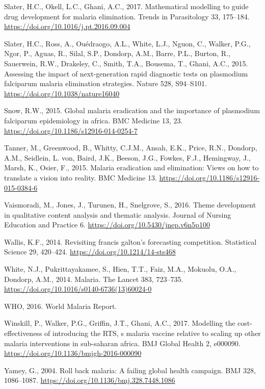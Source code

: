 \documentclass[]{article}
\begin{document}
\hypertarget{ref-Slater2017}{}
Slater, H.C., Okell, L.C., Ghani, A.C., 2017. Mathematical modelling to
guide drug development for malaria elimination. Trends in Parasitology
33, 175--184. \url{https://doi.org/10.1016/j.pt.2016.09.004}

\hypertarget{ref-Slater2015}{}
Slater, H.C., Ross, A., Ouédraogo, A.L., White, L.J., Nguon, C., Walker,
P.G., Ngor, P., Aguas, R., Silal, S.P., Dondorp, A.M., Barre, P.L.,
Burton, R., Sauerwein, R.W., Drakeley, C., Smith, T.A., Bousema, T.,
Ghani, A.C., 2015. Assessing the impact of next-generation rapid
diagnostic tests on plasmodium falciparum malaria elimination
strategies. Nature 528, S94--S101.
\url{https://doi.org/10.1038/nature16040}

\hypertarget{ref-Snow2015}{}
Snow, R.W., 2015. Global malaria eradication and the importance of
plasmodium falciparum epidemiology in africa. BMC Medicine 13, 23.
\url{https://doi.org/10.1186/s12916-014-0254-7}

\hypertarget{ref-Tanner2015}{}
Tanner, M., Greenwood, B., Whitty, C.J.M., Ansah, E.K., Price, R.N.,
Dondorp, A.M., Seidlein, L. von, Baird, J.K., Beeson, J.G., Fowkes,
F.J., Hemingway, J., Marsh, K., Osier, F., 2015. Malaria eradication and
elimination: Views on how to translate a vision into reality. BMC
Medicine 13. \url{https://doi.org/10.1186/s12916-015-0384-6}

\hypertarget{ref-Vaismoradi_2016}{}
Vaismoradi, M., Jones, J., Turunen, H., Snelgrove, S., 2016. Theme
development in qualitative content analysis and thematic analysis.
Journal of Nursing Education and Practice 6.
\url{https://doi.org/10.5430/jnep.v6n5p100}

\hypertarget{ref-Wallis2014}{}
Wallis, K.F., 2014. Revisiting francis galton's forecasting competition.
Statistical Science 29, 420--424.
\url{https://doi.org/10.1214/14-sts468}

\hypertarget{ref-White2014}{}
White, N.J., Pukrittayakamee, S., Hien, T.T., Faiz, M.A., Mokuolu, O.A.,
Dondorp, A.M., 2014. Malaria. The Lancet 383, 723--735.
\url{https://doi.org/10.1016/s0140-6736(13)60024-0}

\hypertarget{ref-World2016}{}
WHO, 2016. World Malaria Report.

\hypertarget{ref-Winskill2017}{}
Winskill, P., Walker, P.G., Griffin, J.T., Ghani, A.C., 2017. Modelling
the cost-effectiveness of introducing the RTS, s malaria vaccine
relative to scaling up other malaria interventions in sub-saharan
africa. BMJ Global Health 2, e000090.
\url{https://doi.org/10.1136/bmjgh-2016-000090}

\hypertarget{ref-Yamey2004}{}
Yamey, G., 2004. Roll back malaria: A failing global health campaign.
BMJ 328, 1086--1087. \url{https://doi.org/10.1136/bmj.328.7448.1086}
\end{document}
